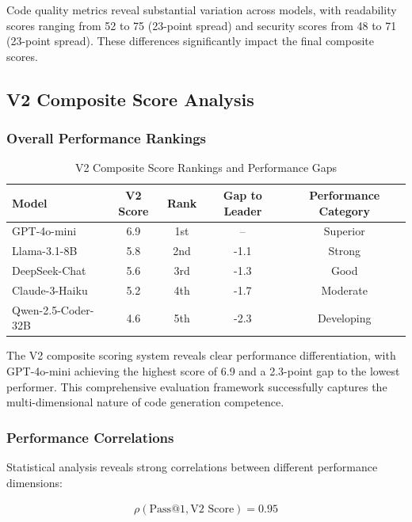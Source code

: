 \documentclass[conference]{IEEEtran}
\begin{document}
Code quality metrics reveal substantial variation across models, with readability scores ranging from 52 to 75 (23-point spread) and security scores from 48 to 71 (23-point spread). These differences significantly impact the final composite scores.

\subsection{V2 Composite Score Analysis}

\subsubsection{Overall Performance Rankings}

\begin{table}[ht]
\centering
\small
\caption{V2 Composite Score Rankings and Performance Gaps}
\begin{tabular}{lcccc}
\toprule
\textbf{Model} & \textbf{V2 Score} & \textbf{Rank} & \textbf{Gap to Leader} & \textbf{Performance Category} \\
\midrule
GPT-4o-mini & 6.9 & 1st & -- & Superior \\
Llama-3.1-8B & 5.8 & 2nd & -1.1 & Strong \\
DeepSeek-Chat & 5.6 & 3rd & -1.3 & Good \\
Claude-3-Haiku & 5.2 & 4th & -1.7 & Moderate \\
Qwen-2.5-Coder-32B & 4.6 & 5th & -2.3 & Developing \\
\bottomrule
\end{tabular}
\label{tab:v2_scores}
\end{table}

The V2 composite scoring system reveals clear performance differentiation, with GPT-4o-mini achieving the highest score of 6.9 and a 2.3-point gap to the lowest performer. This comprehensive evaluation framework successfully captures the multi-dimensional nature of code generation competence.

\subsubsection{Performance Correlations}

Statistical analysis reveals strong correlations between different performance dimensions:

\begin{align}
\rho(\text{Pass@1}, \text{V2 Score}) = 0.95
\end{align}
\end{document}
